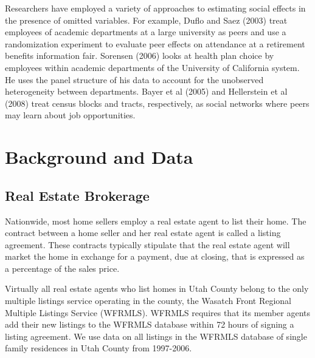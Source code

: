 \documentclass[12pt]{article}
\begin{document}
    Researchers have employed a variety of approaches to estimating social effects in the presence of omitted variables. For example, Duflo and Saez (2003) treat employees of academic departments at a large university as peers and use a randomization experiment to evaluate peer effects on attendance at a retirement benefits information fair. Sorensen (2006) looks at health plan choice by employees within academic departments of the University of California system. He uses the panel structure of his data to account for the unobserved heterogeneity between departments.
    Bayer et al (2005) and Hellerstein et al (2008) treat census blocks and tracts, respectively, as social networks where peers may learn  about job opportunities.
    
%
%
%
%    
%
%
%

\section{Background and Data}

\subsection*{Real Estate Brokerage}
    Nationwide, most home sellers employ a real estate agent to list their home. The contract between a home seller and her real estate agent is  called a listing agreement. These contracts typically stipulate that the real estate agent will market the home in exchange for a payment, due at  closing, that is expressed as a percentage of the sales price.

    Virtually all real estate agents who list homes in Utah County belong to the only multiple listings service operating in the county, the Wasatch  Front Regional Multiple Listings Service (WFRMLS).  WFRMLS requires that its member agents add their new listings to the WFRMLS database within 72 hours of signing a listing agreement. We use data on all listings in the WFRMLS database of single family residences in Utah County from 1997-2006.
\end{document}
